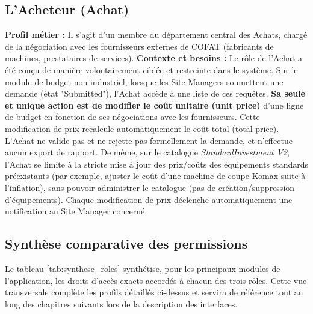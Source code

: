 \subsection{L'Acheteur (Achat)}
\textbf{Profil métier :} Il s'agit d'un membre du département central des Achats, chargé de la négociation avec les fournisseurs externes de COFAT (fabricants de machines, prestataires de services).
\newline
\textbf{Contexte et besoins :} Le rôle de l'Achat a été conçu de manière volontairement ciblée et restreinte dans le système. Sur le module de budget non-industriel, lorsque les Site Managers soumettent une demande (état "Submitted"), l'Achat accède à une liste de ces requêtes. \textbf{Sa seule et unique action est de modifier le coût unitaire (unit price)} d'une ligne de budget en fonction de ses négociations avec les fournisseurs. Cette modification de prix recalcule automatiquement le coût total (total price). L'Achat ne valide pas et ne rejette pas formellement la demande, et n'effectue aucun export de rapport. De même, sur le catalogue \textit{StandardInvestment V2}, l'Achat se limite à la stricte mise à jour des prix/coûts des équipements standards préexistants (par exemple, ajuster le coût d'une machine de coupe Komax suite à l'inflation), sans pouvoir administrer le catalogue (pas de création/suppression d'équipements). Chaque modification de prix déclenche automatiquement une notification au Site Manager concerné.

\subsection{Synthèse comparative des permissions}
Le tableau \ref{tab:synthese_roles} synthétise, pour les principaux modules de l'application, les droits d'accès exacts accordés à chacun des trois rôles. Cette vue transversale complète les profils détaillés ci-dessus et servira de référence tout au long des chapitres suivants lors de la description des interfaces.

